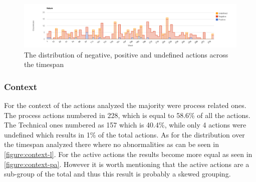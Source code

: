 \begin{figure}
	\centering
	\includegraphics[width=\textwidth, keepaspectratio]{figures/nature-l.png}
	\caption{The distribution of negative, positive and undefined actions across the timespan}
	\label{figure:nature-l}
\end{figure}

\clearpage

\subsubsection{Context}
For the context of the actions analyzed the majority were process related ones. The process actions numbered in 228, which is equal to 58.6\% of all the actions. The Technical ones numbered as 157 which is 40.4\%, while only 4 actions were undefined which results in 1\% of the total actions. As for the distribution over the timespan analyzed there where no abnormalities as can be seen in \autoref{figure:context-l}. For the active actions the results become more equal as seen in \autoref{figure:context-pa}. However it is worth mentioning that the active actions are a sub-group of the total and thus this result is probably a skewed grouping. 

\begin{table}[!h]
	\begin{center}
	\caption{Analysis results from the content analysis for the context of the action.}
	\label{table:context-results}
	\end{center}
\end{table}

